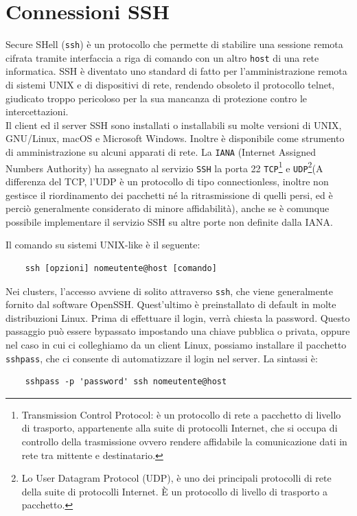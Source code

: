 \documentclass[11pt]{book}
\begin{document}
\chapter{Connessioni SSH}
Secure SHell (\verb*|ssh|) è un protocollo che permette di stabilire una sessione remota cifrata tramite interfaccia a riga di comando con un altro \verb*|host| di una rete informatica. SSH è diventato uno standard di fatto per l'amministrazione remota di sistemi UNIX e di dispositivi di rete, rendendo obsoleto il protocollo telnet, giudicato troppo pericoloso per la sua mancanza di protezione contro le intercettazioni.\\
Il client ed il server SSH sono installati o installabili su molte versioni di UNIX, GNU/Linux, macOS e Microsoft Windows. Inoltre è disponibile come strumento di amministrazione su alcuni apparati di rete. La \verb*|IANA| (Internet Assigned Numbers Authority) ha assegnato al servizio \verb*|SSH| la porta 22 \verb*|TCP|\footnote{Transmission Control Protocol: è un protocollo di rete a pacchetto di livello di trasporto, appartenente alla suite di protocolli Internet, che si occupa di controllo della trasmissione ovvero rendere affidabile la comunicazione dati in rete tra mittente e destinatario.} e \verb*|UDP|\footnote{Lo User Datagram Protocol (UDP), è uno dei principali protocolli di rete della suite di protocolli Internet. È un protocollo di livello di trasporto a pacchetto.}(A differenza del TCP, l'UDP è un protocollo di tipo connectionless, inoltre non gestisce il riordinamento dei pacchetti né la ritrasmissione di quelli persi, ed è perciò generalmente considerato di minore affidabilità), anche se è comunque possibile implementare il servizio SSH su altre porte non definite dalla IANA.

Il comando su sistemi UNIX-like è il seguente: 
\begin{verbatim}
	ssh [opzioni] nomeutente@host [comando]
\end{verbatim}

Nei clusters, l'accesso avviene di solito attraverso \verb*|ssh|, che viene generalmente fornito dal software OpenSSH. Quest'ultimo è preinstallato di default in molte distribuzioni Linux. Prima di effettuare il login, verrà chiesta la password. Questo passaggio può essere bypassato impostando una chiave pubblica o privata, oppure nel caso in cui ci colleghiamo da un client Linux, possiamo installare il pacchetto \verb*|sshpass|, che ci consente di automatizzare il login nel server. La sintassi è:
\begin{verbatim}
	sshpass -p 'password' ssh nomeutente@host
\end{verbatim}
\end{document}
